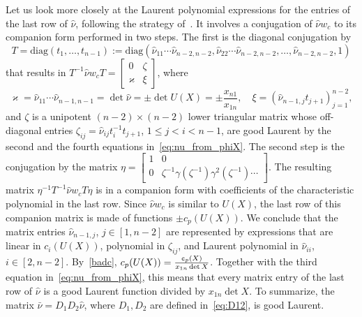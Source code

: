 \documentclass{amsart}
\theoremstyle{definition}
\theoremstyle{remark}
\numberwithin{equation}{section}
\numberwithin{theorem}{section}
\def\ec{{\tt c}}
\begin{document}
Let us look more closely at the Laurent polynomial expressions for the entries of the last row of $\hat\nu$, following the strategy of~\cite[Section 7.3.2]{GSVdouble}.
It involves a conjugation of $\hat\nu w_c$ to its companion form performed in two steps. The first is the diagonal conjugation by 
\[
T=\mbox{diag}(t_1,\ldots,t_{n-1}):=\mbox{diag}(\hat\nu_{11}\cdots\hat\nu_{n-2,n-2}, \hat\nu_{22}\cdots\hat\nu_{n-2,n-2},\ldots,\hat\nu_{n-2,n-2}, 1)
\]
that results in $T^{-1} \hat\nu w_c T =\begin{bmatrix}0 & \zeta\\ \varkappa & \xi   \end{bmatrix}$, where 
\[
\varkappa= \hat\nu_{11}\cdots\hat\nu_{n-1,n-1}= \det\hat\nu=\pm \det U(X) = \pm \frac{x_{n1}}{x_{1n}}, \quad
\xi = (\hat\nu_{n-1,j}t_{j+1})_{j=1}^{n-2}, 
\]
and $\zeta$ is a unipotent $(n-2)\times (n-2)$ lower triangular matrix whose off-diagonal entries $\zeta_{ij}= \hat\nu_{ij}t_i^{-1}t_{j+1}$,  $1\le j<i<n-1$, are good Laurent by the second and the fourth equations 
in~\eqref{eq:nu_from_phiX}. The second step is the conjugation by the matrix 
$\eta=\begin{bmatrix} 1 & 0\\ 0 & \zeta^{-1} \gamma(\zeta^{-1}) \gamma^2(\zeta^{-1}) \cdots  \end{bmatrix}$. The resulting matrix
$\eta^{-1}T^{-1} \hat\nu w_c T\eta$ is in a  companion form with coefficients of the characteristic polynomial in the last row. Since $\hat\nu w_c$ is similar to $U(X)$, the last row of this companion matrix is made of functions 
$\pm c_p(U(X))$. We conclude that the matrix entries $\hat\nu_{n-1,j}$,  $j\in[1, n-2]$ are represented by expressions that are linear in $c_i(U(X))$, polynomial in $\zeta_{ij}$, and Laurent polynomial in $\hat\nu_{ii}$, $i\in[2, n-2]$. 
By~\eqref{badc},
$c_p(U(X))=\frac{\ec_p(X)}{x_{1n}\det X}$. Together with the third equation in~\eqref{eq:nu_from_phiX}, this means that every matrix entry of the last row of $\hat\nu$ is a good Laurent function divided by $x_{1n}\det X$. To summarize, the matrix $\bar \nu=D_1 D_2 \hat\nu$, where $D_1, D_2$ are defined in~\eqref{eq:D12}, is good Laurent.
\end{document}
